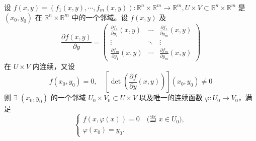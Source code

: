 \documentclass[lang=cn,newtx,10pt,scheme=chinese,thmcnt=chapter]{elegantbook}
\begin{document}
\begin{example}
 设 \(f(x, y) = \left(f_1(x, y), \cdots, f_m(x, y)\right) : \mathbb{R}^n \times \mathbb{R}^m \rightarrow \mathbb{R}^m, U \times V \subset \mathbb{R}^n \times \mathbb{R}^m\) 是 \( (x_0, y_0) \) 在 \( \mathbb{R}^n \times \mathbb{R}^m \) 中的一个邻域。设 \( f(x, y) \) 及
\begin{equation*}
\frac{\partial f(x, y)}{\partial y} = \left( \begin{array}{ccc}
\frac{\partial f_1}{\partial y_1}(x, y) & \cdots & \frac{\partial f_1}{\partial y_m}(x, y) \\
\vdots & \ddots & \vdots \\
\frac{\partial f_m}{\partial y_1}(x, y) & \cdots & \frac{\partial f_m}{\partial y_m}(x, y)
\end{array} \right)
\end{equation*}
在 \( U \times V \) 内连续，又设
\begin{equation*}
f(x_0, y_0) = 0, \quad \left[\operatorname{det}\left(\frac{\partial f}{\partial y}(x, y)\right)\right](x_0, y_0) \neq 0
\end{equation*}
则 \( \exists \) \( (x_0, y_0) \) 的一个邻域 \( U_0 \times V_0 \subset U \times V \) 以及唯一的连续函数 \( \varphi: U_0 \rightarrow V_0 \)，满足
\begin{equation*}
\left\{
\begin{array}{l}
f(x, \varphi(x)) = 0 \quad \text{(当 } x \in U_0), \\
\varphi(x_0) = y_0 .
\end{array}
\right.
\end{equation*}
\end{example}
\end{document}
